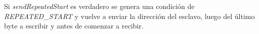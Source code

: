 Si \emph{sendRepeatedStart} es verdadero se genera una condición de \emph{REPEATED\_START} y vuelve a enviar la dirección del esclavo, luego del último byte a escribir y antes de comenzar a recibir.

 